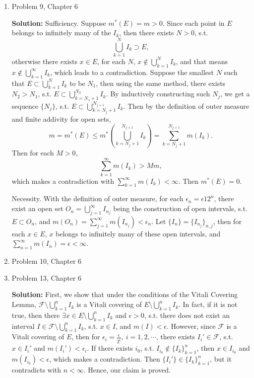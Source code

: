 \documentclass{article}%
\begin{document}
\begin{enumerate}
\item  Problem 9,  Chapter 6 

\smallskip
\textbf{Solution:}
\smallskip
Sufficiency. Suppose $m^*(E) = m > 0$. Since each point in $E$ belongs to infinitely many of the $I_k $, then there exists $N > 0$, s.t. 
$$
\bigcup_{k=1}^N I_k\supset E,
$$
otherwise there exists $x\in E$, for each $N$, $x\notin \bigcup\limits_{k=1}^N I_k $, and that means $x\notin \bigcup\limits_{k=1}^{\infty}I_k $, which leads to a contradiction. Suppose the smallest $N$ such that $E \subset \bigcup\limits_{k=1}^N I_k$ to be $N_1 $, then using the same method, there exists $N_2 > N_1 $, s.t. $E \subset \bigcup\limits_{k=N_1+1}^{N_2} I_k$. By inductively constructing such $N_j $, we get a sequence $\{N_j\}$, s.t. $E \subset \bigcup\limits_{k=N_j+1}^{N_{j+1}} I_k $. Then by the definition of outer measure and finite addivity for open sets, 
$$
m = m^*(E) \le m^*(\bigcup\limits_{k=N_j+1}^{N_{j+1}}I_k) = \sum_{k = N_j+1}^{N_{j+1}}m(I_k).
$$
Then for each $M > 0$,
$$
\sum_{k=1}^{\infty}m(I_k) > Mm, 
$$
which makes a contradiction with $\sum_{k=1}^{\infty}m(I_k) < \infty$. Then $m^*(E) = 0$.

Necessity. With the definition of outer measure, for each $\epsilon_n = \epsilon{1}{2^n} $, there exist an open set $O_n = \bigcup\limits_{j=1}^{\infty}I_{n_j} $ being the construction of open intervals, s.t. $E\subset O_n $, and $m(O_n) = \sum\limits_{j=1}^{\infty}m(I_{n_j}) < \epsilon_n $. Let $\{I_n\} = \{I_{n_j}\}_{n, j} $, then for each $x\in E$, $x$ belongs to infinitely many of these open intervals, and $\sum\limits_{n=1}^{\infty}m(I_n) = \epsilon < \infty$.

\bigskip
\item  Problem 10, Chapter 6
\item  Problem 13, Chapter 6

\smallskip
\textbf{Solution:}
\smallskip
First, we show that under the conditions of the Vitali Covering Lemma, $\mathcal{F}\setminus \bigcup\limits_{k=1}^n I_k $ is a Vitali covering of $E\setminus \bigcup\limits_{k=1}^n I_k$. In fact, if it is not true, then there $\exists x\in E\setminus\bigcup\limits_{k=1}^n I_k$ and $\epsilon > 0$, s.t. there does not exist an interval $I\in\mathcal{F}\setminus\bigcup\limits_{k=1}^n I_k$, s.t. $x\in I$, and $m(I) < \epsilon$. However, since $\mathcal{F}$ is a Vitali covering of $E$, then for $\epsilon_i = \frac{\epsilon}{2^i}, ~i = 1, 2, \cdots $, there exists $I_i'\in\mathcal{F} $, s.t. $x\in I_i' $ and $m(I_i') < \epsilon_i $. If there exists $i_0 $, s.t. $I_{i_0}\notin \{I_k\}_{k = 1}^{n} $, then $x\in I_{i_0} $ and $m(I_{i_0}) < \epsilon$, which makes a contradiction. Then $\{I_i'\} \in \{I_k\}_{k = 1}^{n}$, but it contradicts with $n < \infty$. Hence, our claim is proved.


\end{enumerate}
\end{document}
